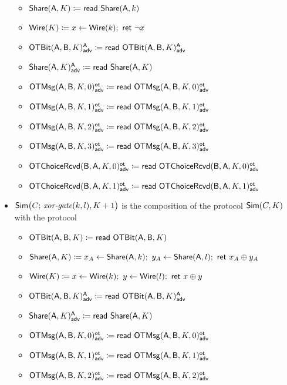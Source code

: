 \begin{itemize}
\begin{itemize}
\item $\Share(\A,K) \coloneqq \read{\Share(\A,k)}$
\item $\Wire(K) \coloneqq x \leftarrow \Wire(k); \ \ret{\neg x}$\medskip
\item {\color{blue} $\LeakOTBit(\A,\B,K)^\A_\adv \coloneqq \read{\LeakOTBit(\A,\B,K)^\A_\adv}$}
\item {\color{blue} $\LeakShare(\A,K)^\A_\adv \coloneqq \read{\Share(\A,K)}$}\medskip
\item {\color{blue} $\LeakOTMsg(\A,\B,K,0)^\ot_\adv \coloneqq \read{\LeakOTMsg(\A,\B,K,0)^\ot_\adv}$}
\item {\color{blue} $\LeakOTMsg(\A,\B,K,1)^\ot_\adv \coloneqq \read{\LeakOTMsg(\A,\B,K,1)^\ot_\adv}$}
\item {\color{blue} $\LeakOTMsg(\A,\B,K,2)^\ot_\adv \coloneqq \read{\LeakOTMsg(\A,\B,K,2)^\ot_\adv}$}
\item {\color{blue} $\LeakOTMsg(\A,\B,K,3)^\ot_\adv \coloneqq \read{\LeakOTMsg(\A,\B,K,3)^\ot_\adv}$}\medskip
\item {\color{blue} $\LeakOTChoiceRcvd(\B,\A,K,0)^\ot_\adv \coloneqq \read{\LeakOTChoiceRcvd(\B,\A,K,0)^\ot_\adv}$}
\item {\color{blue} $\LeakOTChoiceRcvd(\B,\A,K,1)^\ot_\adv \coloneqq \read{\LeakOTChoiceRcvd(\B,\A,K,1)^\ot_\adv}$}
\end{itemize}
\item $\Sim\big(C; \, \xorgate(k,l),K+1\big)$ is the composition of the protocol $\Sim(C,K)$ with the protocol
\begin{itemize}
\item $\OTBit(\A,\B,K) \coloneqq \read{\OTBit(\A,\B,K)}$
\item $\Share(\A,K) \coloneqq x_A \leftarrow \Share(\A,k); \ y_A \leftarrow \Share(\A,l); \ \ret{x_A \oplus y_A}$
\item $\Wire(K) \coloneqq x \leftarrow \Wire(k); \ y \leftarrow \Wire(l); \ \ret{x \oplus y}$\medskip
\item {\color{blue} $\LeakOTBit(\A,\B,K)^\A_\adv \coloneqq \read{\LeakOTBit(\A,\B,K)^\A_\adv}$}
\item {\color{blue} $\LeakShare(\A,K)^\A_\adv \coloneqq \read{\Share(\A,K)}$}\medskip
\item {\color{blue} $\LeakOTMsg(\A,\B,K,0)^\ot_\adv \coloneqq \read{\LeakOTMsg(\A,\B,K,0)^\ot_\adv}$}
\item {\color{blue} $\LeakOTMsg(\A,\B,K,1)^\ot_\adv \coloneqq \read{\LeakOTMsg(\A,\B,K,1)^\ot_\adv}$}
\item {\color{blue} $\LeakOTMsg(\A,\B,K,2)^\ot_\adv \coloneqq \read{\LeakOTMsg(\A,\B,K,2)^\ot_\adv}$}

\end{itemize}
\end{itemize}
